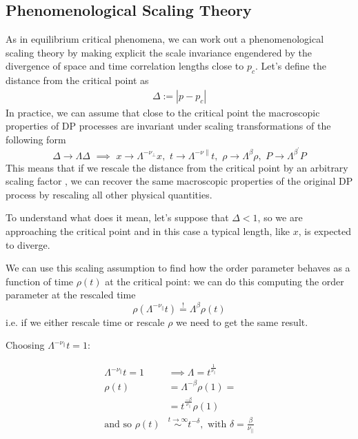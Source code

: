 \documentclass[\main/main.tex]{subfiles}
\begin{document}
\subsection{Phenomenological Scaling Theory}

As in equilibrium critical phenomena, we can work out a phenomenological scaling theory by making explicit the scale invariance engendered by the divergence of space and time
correlation lengths close to $p_c$.
Let's define the distance from the critical point as
\begin{align}
    \Delta:=|p-p_c|
\end{align}
In practice, we can assume that close to the critical point the macroscopic properties of DP processes are invariant under scaling transformations of the following form
\begin{equation}
\Delta \rightarrow \Lambda \Delta \,\,\implies\,\, x \rightarrow \Lambda^{-\nu_{\perp}} x, \,\,t \rightarrow \Lambda^{-\nu \|} t,\,\, \rho \rightarrow \Lambda^{\beta} \rho, \,\,P \rightarrow \Lambda^{\beta^{\prime}} P
\label{eq:scaling2}
\end{equation}
This means that if we rescale the
distance from the critical point by an arbitrary scaling factor  , we can recover the same macroscopic properties of the original DP process by rescaling all other physical quantities.

To understand what does it mean, let's suppose that $\Delta<1$, so we are approaching the critical point and in this case a typical length, like $x$, is expected to diverge.

We can use this scaling assumption to find how the order parameter behaves as a function of time $\rho(t)$ at the critical point: we can do this computing the order parameter at the rescaled time
\begin{equation}
    \rho(\Lambda^{-\nu_\|}t)\overset{!}{=}\Lambda^\beta \rho(t)
\end{equation}
i.e. if we either rescale time or rescale $\rho$ we need to get the same result.

Choosing $\Lambda^{-\nu_\|}t=1$:

\begin{align}
  \Lambda^{-\nu_\|}t=1 &\implies \Lambda=t^{\frac{1}{\nu_\|}} \\
    \rho(t)&=\Lambda^{-\beta}\rho(1)=\\
    &=t^{\frac{-\beta}{\nu_\|}}\rho(1) \\
    \text{and so}\,\, \rho(t) &\overset{t\to\infty}{\sim} t^{-\delta},\,\, \text{with}\,\, \delta=\frac{\beta}{\nu_\|}
\end{align}
\end{document}
